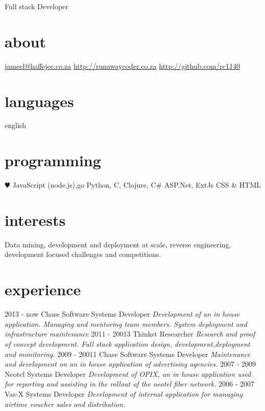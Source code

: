 \documentclass[]{jameel-cv}
\begin{document}
       {Full stack Developer}


\begin{aside}
  \section{about}
    \href{mailto:jameel@haffejee.co.za}{jameel@haffejee.co.za}
    \href{http://runawaycoder.co.za}{http://runawaycoder.co.za}
    \href{http://github.com/rc1140}{http://github.com/rc1140}
  \section{languages}
    english
  \section{programming}
    {\color{red} $\varheartsuit$} JavaScript
    (node.js),go
    Python, C, Clojure, C\#
    ASP.Net, ExtJs
    CSS \& HTML
\end{aside}

\section{interests}

Data mining, development and deployment at scale, reverse engineering, development focused challenges and competitions.

\section{experience}

\begin{entrylist}
   \entry
    {2013 - now }
    {Chase Software}
    {Systems Developer}
    {\emph{Development of an in house application. Managing and mentoring team members. System deployment and infrastructure maintenance}}
   \entry
    {2011 - 20013}
    {Thinkst}
    {Researcher}
    {\emph{Research and proof of concept development. Full stack application design, development,deployment and monitoring.}}
  \entry
    {2009 - 20011}
    {Chase Software}
    {Systems Developer}
    {\emph{Maintenance and development on an in house application of advertising agencies.}}
  \entry
    {2007 - 2009}
    {Neotel}
    {Systems Developer}
    {\emph{Development of OPIX, an in house application used for reporting and assisting in the rollout of the neotel fiber network.}}
  \entry
    {2006 - 2007}
    {Vas-X}
    {Systems Developer}
    {\emph{Development of internal application for managing airtime voucher sales and distribution.}}
\end{entrylist}
\end{document}
